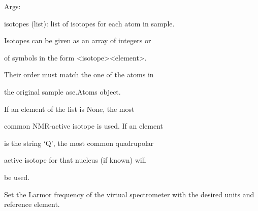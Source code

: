 \documentclass[letterpaper,10pt,english]{sphinxmanual}
\begin{document}
\begin{fulllineitems}
\begin{fulllineitems}
\begin{DUlineblock}{0em}
\item[] Args:
\item[]
\begin{DUlineblock}{\DUlineblockindent}
\item[] isotopes (list): list of isotopes for each atom in sample.
\item[]
\begin{DUlineblock}{\DUlineblockindent}
\item[] Isotopes can be given as an array of integers or
\item[] of symbols in the form \textless{}isotope\textgreater{}\textless{}element\textgreater{}.
\item[] Their order must match the one of the atoms in
\item[] the original sample ase.Atoms object.
\item[] If an element of the list is None, the most
\item[] common NMR-active isotope is used. If an element
\item[] is the string `Q', the most common quadrupolar
\item[] active isotope for that nucleus (if known) will
\item[] be used.
\end{DUlineblock}
\end{DUlineblock}
\end{DUlineblock}

\end{fulllineitems}


\begin{fulllineitems}
\label{doctree/soprano.calculate.nmr.nmr:soprano.calculate.nmr.nmr.NMRCalculator.set_larmor_frequency}
Set the Larmor frequency of the virtual spectrometer with the desired
units and reference element.


\end{fulllineitems}
\end{fulllineitems}
\end{document}

